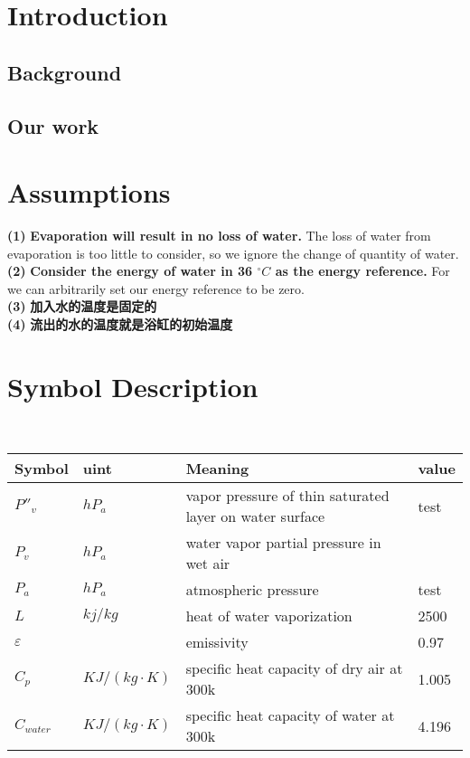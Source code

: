 \documentclass{mcmthesis}
\begin{document}
\setcounter{page}{1}
\section{Introduction}
\subsection{Background}%

\subsection{Our work}


\section{Assumptions}
\noindent
{\bf (1) } \textbf{Evaporation will result in no loss of water.} The loss of water from evaporation is too little to consider, so we ignore the change of quantity of water.\\
{\bf (2) } \textbf{Consider the energy of water in 36 ${^\circ}C$ as the energy reference.} For we can arbitrarily set our energy reference to be zero.\\
{\bf (3) } \textbf{加入水的温度是固定的} \\
{\bf (4) } \textbf{流出的水的温度就是浴缸的初始温度} \\

\section{Symbol Description}
\begin{table}[H]
        \setlength{\abovecaptionskip}{0pt}
        \setlength{\belowcaptionskip}{0pt}
				\\
        \begin{tabular}{p{2cm}|p{2cm}|p{7.5cm}|p{1.7cm}}
		\hline
		\rowcolor[gray]{0.9}\bf{Symbol}	&\bf{uint}      &\bf{Meaning}&\bf{value}	\\
		\hline
		${P}''_{v}$		& $hP_{a}$		 & vapor pressure of thin saturated layer on water surface  &test\\
		$P_{v}$		& $hP_{a}$		 & water vapor partial pressure in wet air\\
		$P_{a}$		& $hP_{a}$		 & atmospheric pressure  &test\\
		$L$		& $kj/kg$		 & heat of water vaporization&2500\\
		$\varepsilon$		& 		 & emissivity&0.97\\
		$C_{p}$		& $KJ/(kg\cdot K)$		 & specific heat capacity of dry air at 300k &1.005\\
		$C_{water}$		& $KJ/(kg\cdot K)$		 & specific heat capacity of water at 300k &4.196\\

		\hline
		\end{tabular}
	\end{table}
\end{document}
